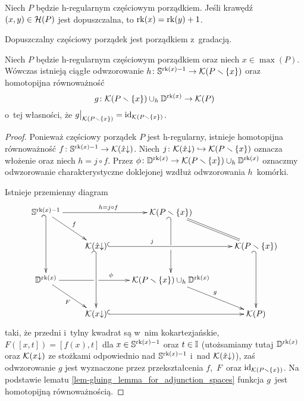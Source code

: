 \begin{lem}\label{minianlemma}
Niech $P$ będzie h-regularnym częściowym porządkiem. Jeśli krawędź $(x,y)\in\mathcal{H}(P)$ jest dopuszczalna, to $\operatorname{rk}(x)=\operatorname{rk}(y)+1$.
\end{lem}

\begin{wn}\label{wn-minianlemma}
Dopuszczalny częściowy porządek jest porządkiem z~gradacją.
\end{wn}

\begin{lem}\label{lem-h-regular_cell_gluing_lemma}
Niech $P$ będzie h-regularnym częściowym porządkiem oraz niech $x\in \max(P)$. Wówczas istnieją ciągłe odwzorowanie $h\colon \mathbb{S}^{\operatorname{rk}(x)-1}\to \mathcal{K}(P\smallsetminus\{x\})$ oraz homotopijna równoważność \[g\colon \mathcal{K}(P\smallsetminus \{x\})\cup_{h} \mathbb{D}^{\operatorname{rk}(x)}\to \mathcal{K}(P)\] o~tej własności, że $g\big |_{\mathcal{K}(P\smallsetminus\{x\})}=\operatorname{id}_{\mathcal{K}(P\smallsetminus\{x\})}$.
\end{lem}
\begin{proof}
Ponieważ częściowy porządek $P$ jest h-regularny, istnieje homotopijna równoważność $f\colon \mathbb{S}^{\operatorname{rk}(x)-1}\to \mathcal{K}(\hat{x}\mathord{\downarrow})$. Niech $j\colon \mathcal{K}(\hat{x}\mathord{\downarrow})\hookrightarrow \mathcal{K}(P\smallsetminus \{x\})$ oznacza włożenie oraz niech $h=j\circ f$. Przez $\phi\colon \mathbb{D}^{\operatorname{rk}(x)}\to \mathcal{K}(P\smallsetminus\{x\})\cup_{h} \mathbb{D}^{\operatorname{rk}(x)}$ oznaczmy odwzorowanie charakterystyczne doklejonej wzdłuż odwzorowania $h$~komórki.

Istnieje przemienny diagram
\[
\xymatrix{
\S^{\Ht(x)-1} \ar[rr]^{h=j\circ f}\ar@{_{(}->}[dd] & & \mK(P\smallsetminus\{x\})\ar@{_{(}->}'[d][dd]
\\
& \mK(\hat{x}\mathord{\downarrow}) \ar@{<-}[ul]_{f}\ar@{^{(}->}[rr]^(0.35)j\ar@{_{(}->}[dd] & & \mK(P\smallsetminus\{x\}) \ar@{=}[ul]\ar@{_{(}->}[dd]
\\
\D^{\Ht(x)} \ar'[r][rr]^(0.2){\phi} & & \mK(P\smallsetminus\{x\})\cup_{h}\D^{\Ht(x)}
\\
& \mK(x\mathord{\downarrow}) \ar@{^(->}[rr]\ar@{<-}[ul]^{F} & & \mK(P) \ar@{<-}[ul]_{g}
}
\]
taki, że przedni i~tylny kwadrat są w~nim kokartezjańskie, $F([x,t])=[f(x),t]$ dla $x\in \mathbb{S}^{\operatorname{rk}(x)-1}$ oraz $t\in\mathbb{I}$ (utożsamiamy tutaj $\mathbb{D}^{\operatorname{rk}(x)}$ oraz $\mathcal{K}(x\mathord{\downarrow})$ ze stożkami odpowiednio nad $\mathbb{S}^{\operatorname{rk}(x)-1}$ i~nad $\mathcal{K}(\hat{x}\mathord{\downarrow})$), zaś odwzorowanie $g$ jest wyznaczone przez przekształcenia $f$,~$F$~oraz $\operatorname{id}_{\mathcal{K}(P\smallsetminus \{x\})}$. Na podstawie lematu \ref{lem-gluing_lemma_for_adjunction_spaces} funkcja $g$~jest homotopijną równoważnością.
\end{proof}

